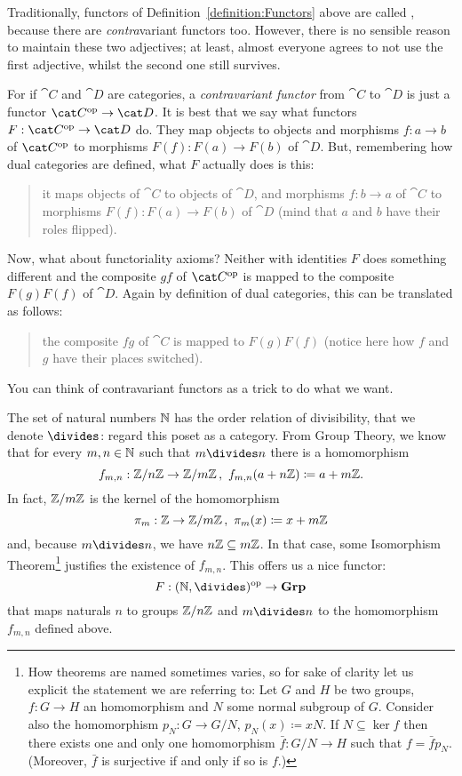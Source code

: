 Traditionally, functors of Definition~\ref{definition:Functors} above
are called , because there are {\em contra}variant
functors too. However, there is no sensible reason to maintain these
two adjectives; at least, almost everyone agrees to not use the first
adjective, whilst the second one still survives.

For if \(\cat C\) and \(\cat D\) are categories, a {\em contravariant
  functor} from \(\cat C\) to \(\cat D\) is just a functor
\(\op{\cat C} \to \cat D\). It is best that we say what functors
\(F : \op{\cat C} \to \cat D\) do. They map objects to objects and
morphisms \(f : a \to b\) of \(\op{\cat C}\) to morphisms
\(F(f) : F(a) \to F(b)\) of \(\cat D\). But, remembering how dual
categories are defined, what \(F\) actually does is this:
\begin{quotation}
  it maps objects of \(\cat C\) to objects of \(\cat D\), and
  morphisms \(f : b \to a\) of \(\cat C\) to morphisms
  \(F(f) : F(a) \to F(b)\) of \(\cat D\) (mind that \(a\) and \(b\)
  have their roles flipped).
\end{quotation}
Now, what about functoriality axioms? Neither with identities \(F\)
does something different and the composite \(gf\) of \(\op{\cat C}\)
is mapped to the composite \(F(g)F(f)\) of \(\cat D\). Again by
definition of dual categories, this can be translated as follows:
\begin{quotation}
  the composite \(fg\) of \(\cat C\) is mapped to \(F(g)F(f)\) (notice
  here how \(f\) and \(g\) have their places switched).
\end{quotation}
You can think of contravariant functors as a trick to do what we want.

\begin{example}
  The set of natural numbers \(\mathbb N\) has the order relation of
  divisibility, that we denote \(\divides\): regard this poset as a
  category. From Group Theory, we know that for every
  \(m, n \in \mathbb N\) such that \(m \divides n\) there is a
  homomorphism
  \[f_{m, n} : \mathbb Z/n\mathbb Z \to \mathbb Z/m\mathbb Z\,,\ f_{m,
      n}(a +n\mathbb Z) \coloneq a + m\mathbb Z .\] In fact,
  \(\mathbb Z/m\mathbb Z\) is the kernel of the homomorphism
  \[\pi_m : \mathbb Z \to \mathbb Z/m\mathbb Z\,, \ \pi_m(x) \coloneq
    x + m\mathbb Z\] and, because \(m \divides n\), we have
  \(n\mathbb Z \subseteq m\mathbb Z\). In that case, some Isomorphism
  Theorem\footnote{How theorems are named sometimes varies, so for
    sake of clarity let us explicit the statement we are referring to:
    Let \(G\) and \(H\) be two groups, \(f : G \to H\) an homomorphism
    and \(N\) some normal subgroup of \(G\). Consider also the
    homomorphism \(p_N : G \to G/N\), \(p_N(x) \coloneq xN\). If
    \(N \subseteq \ker f\) then there exists one and only one
    homomorphism \(\bar f : G/N \to H\) such that \(f = \bar f p_N\).
    (Moreover, \(\bar f\) is surjective if and only if so is \(f\).)}
  justifies the existence of \(f_{m, n}\).  This offers us a nice
  functor:
  \[F : \op{(\naturals, \divides)} \to \Grp\] that maps naturals \(n\)
  to groups \(\mathbb Z/n\mathbb Z\) and \(m \divides n\) to the
  homomorphism \(f_{m,n}\) defined above.
\end{example}

